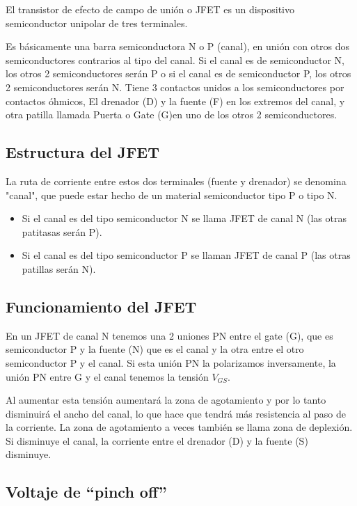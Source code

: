 \documentclass[12pt, a4paper]{article}
\begin{document}
    El transistor de efecto de campo de unión o JFET es un dispositivo semiconductor unipolar de tres terminales.

    Es básicamente una barra semiconductora N o P (canal), en unión con otros dos semiconductores contrarios al tipo del canal. Si el canal es de semiconductor N, los otros 2 semiconductores serán P o si el canal es de semiconductor P, los otros 2 semiconductores serán N. Tiene 3 contactos unidos a los semiconductores por contactos óhmicos, El drenador (D) y la fuente (F) en los extremos del canal, y otra patilla llamada Puerta o Gate (G)en uno de los otros 2 semiconductores.

    \subsection{Estructura del JFET}

    La ruta de corriente entre estos dos terminales (fuente y drenador) se denomina "canal", que puede estar hecho de un material semiconductor tipo P o tipo N.

    \begin{itemize}
        \item Si el canal es del tipo semiconductor N se llama JFET de canal N (las otras patitasas serán P).
        \item Si el canal es del tipo semiconductor P se llaman JFET de canal P (las otras patillas serán N).
    \end{itemize}

    \subsection{Funcionamiento del JFET}

    En un JFET de canal N tenemos una 2 uniones PN entre el gate (G), que es semiconductor P y la fuente (N) que es el canal y la otra entre el otro semiconductor P y el canal. Si esta unión PN la polarizamos inversamente, la unión PN entre G y el canal tenemos la tensión $V_{GS}$. 
    
    Al aumentar esta tensión aumentará la zona de agotamiento y por lo tanto disminuirá el ancho del canal, lo que hace que tendrá más resistencia al paso de la corriente. La zona de agotamiento a veces también se llama zona de deplexión. Si disminuye el canal, la corriente entre el drenador (D) y la fuente (S) disminuye.

    \subsection{Voltaje de “pinch off” }
\end{document}
